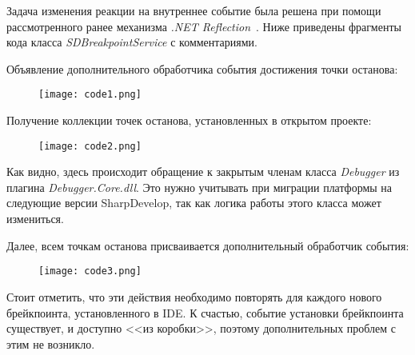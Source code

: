Задача изменения реакции на внутреннее событие была решена при помощи рассмотренного ранее механизма {\it .NET Reflection}~\cite{CLR-via-CS}. Ниже приведены фрагменты кода класса {\it SDBreakpointService} с комментариями.

Объявление дополнительного обработчика события достижения точки останова:

\begin{figure}[!h]
    \texttt{[image: code1.png]}
\end{figure}



Получение коллекции точек останова, установленных в открытом проекте:	

\begin{figure}[!h]
    \texttt{[image: code2.png]}
\end{figure}


Как видно, здесь происходит обращение к закрытым членам класса {\it Debugger} из плагина {\it Debugger.Core.dll}. Это нужно учитывать при миграции платформы на следующие версии SharpDevelop, так как логика работы этого класса может измениться.

Далее, всем точкам останова присваивается дополнительный обработчик события:

\begin{figure}[!h]
    \texttt{[image: code3.png]}
\end{figure}


Стоит отметить, что эти действия необходимо повторять для каждого нового брейкпоинта, установленного в IDE. К счастью, событие установки брейкпоинта существует, и доступно <<из коробки>>, поэтому дополнительных проблем с этим не возникло.

